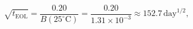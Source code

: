 \documentclass[preview]{standalone}
\begin{document}
\[
\sqrt{t_{\mathrm{EOL}}} = \frac{0.20}{B(25^\circ\mathrm{C})} = \frac{0.20}{1.31 \times 10^{-3}} \approx 152.7\,\mathrm{day}^{1/2},
\]
\end{document}
